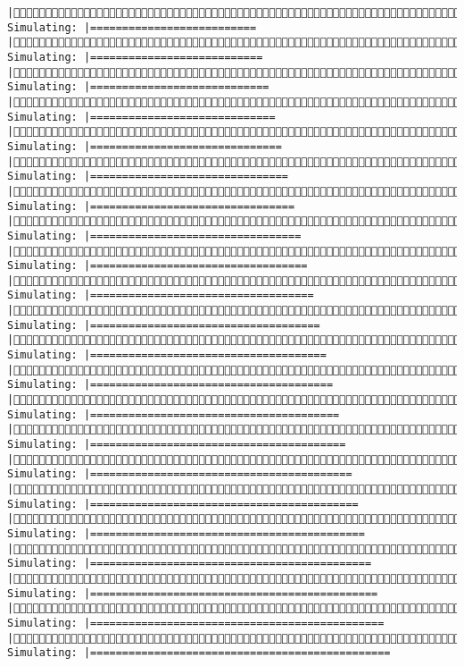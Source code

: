 \documentclass[]{article}
\begin{document}
\begin{verbatim}
|(1/4) Simulating: |==========================                             |(1/4) Simulating: |===========================                            |(1/4) Simulating: |============================                           |(1/4) Simulating: |=============================                          |(1/4) Simulating: |==============================                         |(1/4) Simulating: |===============================                        |(1/4) Simulating: |================================                       |(1/4) Simulating: |=================================                      |(1/4) Simulating: |==================================                     |(1/4) Simulating: |===================================                    |(1/4) Simulating: |====================================                   |(1/4) Simulating: |=====================================                  |(1/4) Simulating: |======================================                 |(1/4) Simulating: |=======================================                |(1/4) Simulating: |========================================               |(1/4) Simulating: |=========================================              |(1/4) Simulating: |==========================================             |(1/4) Simulating: |===========================================            |(1/4) Simulating: |============================================           |(1/4) Simulating: |=============================================          |(1/4) Simulating: |==============================================         |(1/4) Simulating: |===============================================        
\end{verbatim}
\end{document}
